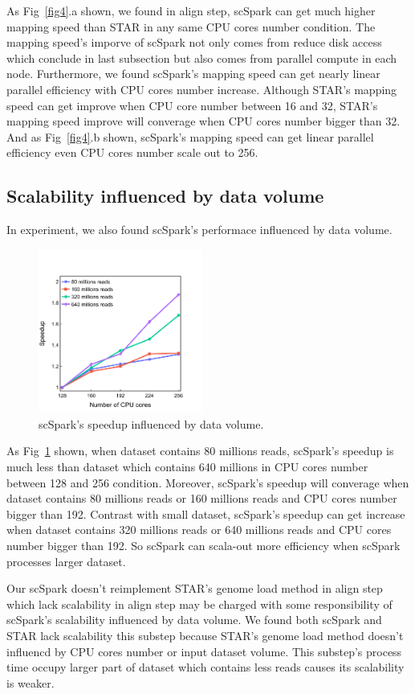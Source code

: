 \documentclass[conference]{IEEEtran}
\begin{document}
As Fig~\ref{fig4}.a shown, we found in align step, scSpark can get much higher mapping speed than STAR in any same CPU cores number condition.
The mapping speed's imporve of scSpark not only comes from reduce disk access which conclude in last subsection but also comes from parallel compute in each node.
Furthermore, we found scSpark's mapping speed can get nearly linear parallel efficiency with CPU cores number increase.
Although STAR's mapping speed can get improve when CPU core number between 16 and 32, STAR's mapping speed improve will converage when CPU cores number bigger than 32.
And as Fig~\ref{fig4}.b shown, scSpark's mapping speed can get linear parallel efficiency even CPU cores number scale out to 256.

\subsection{Scalability influenced by data volume}
In experiment, we also found scSpark's performace influenced by data volume.

\begin{figure}
	\includegraphics[width=0.48\textwidth]{fig5.pdf}
	\caption{scSpark's speedup influenced by data volume.} \label{fig5}
\end{figure}
As Fig~\ref{fig5} shown, when dataset contains 80 millions reads, scSpark's speedup is much less than dataset which contains 640 millions in CPU cores number between 128 and 256 condition.
Moreover, scSpark's speedup will converage when dataset contains 80 millions reads or 160 millions reads and CPU cores number bigger than 192.
Contrast with small dataset, scSpark's speedup can get increase when dataset contains 320 millions reads or 640 millions reads and CPU cores number bigger than 192.
So scSpark can scala-out more efficiency when scSpark processes larger dataset.

Our scSpark doesn't reimplement STAR's genome load method in align step which lack scalability in align step may be charged with some responsibility of scSpark's scalability influenced by data volume.
We found both scSpark and STAR lack scalability this substep because STAR's genome load method doesn't influencd by CPU cores number or input dataset volume.
This substep's process time occupy larger part of dataset which contains less reads causes its scalability is weaker. 
\end{document}
